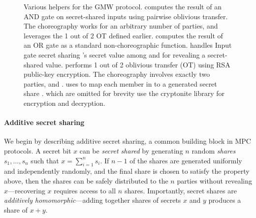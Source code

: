 \begin{figure*}
  \begin{mdframed}
    \inputminted[xleftmargin=10pt,linenos,fontsize=\scriptsize]{Haskell}{figures/gmw-helpers.hs.txt}
    \caption{Various helpers for the GMW protocol.
       computes the result of an AND gate on secret-shared inputs using pairwise oblivious transfer. The choreography works for an arbitrary number of parties, and leverages the 1 out of 2 OT defined earlier.
       computes the result of an OR gate as a standard non-choreographic function.
       handles Input gate secret sharing 's secret value among 
         and for revealing a secret-shared value.
       performs 1 out of 2 oblivious transfer (OT) using RSA public-key encryption. The choreography involves exactly two parties,  and .
       uses  to map each member  in  to a generated secret share .
        which are omitted for brevity use the cryptonite library for encryption and decryption.
    }
    \label{fig:gmw-helpers-multichor-example}
  \end{mdframed}
\end{figure*}

\paragraph{Additive secret sharing}
We begin by describing additive secret sharing, a common building block in MPC protocols. A secret bit $x$ can be \emph{secret shared} by generating $n$ random \emph{shares} $s_1, \dots, s_n$ such that $x = \sum_{i=1}^n s_i$. If $n-1$ of the shares are generated uniformly and independently randomly, and the final share is chosen to satisfy the property above, then the shares can be safely distributed to the $n$ parties without revealing $x$---recovering $x$ requires access to all $n$ shares. Importantly, secret shares are \emph{additively homomorphic}---adding together shares of secrets $x$ and $y$ produces a share of $x+y$.

